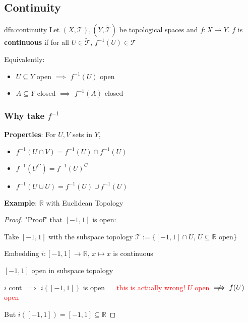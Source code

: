 \documentclass{article}
\begin{document}
\subsection{Continuity}

\begin{dfn}[Continuity]{dfn:continuity}{}
    Let $(X, \mathcal{T}), (Y, \tilde{\mathcal{T}})$ be topological spaces and $f : X \to Y$. $f$ is \textbf{continuous} if for all $U\in \tilde{\mathcal{T}}$, $f^{-1}(U)\in \mathcal{T}$

    \longrule{0.08ex}

    Equivalently:
    \begin{itemize}
        \item $U \subseteq Y$ open $\implies$ $f^{-1}(U)$ open
        \item $A \subseteq Y$ closed $\implies$ $f^{-1}(A)$ closed
    \end{itemize}
\end{dfn}

\subsubsection{Why take \texorpdfstring{$f^{-1}$}{f-1}}

\textbf{Properties}: For $U, V$ sets in $Y$,
\begin{itemize}
    \item $f^{-1}(U \cap V) = f^{-1}(U) \cap f^{-1}(U)$
    \item $f^{-1}(U^{C}) = f^{-1}(U)^{C}$
    \item $f^{-1}(U \cup U) = f^{-1}(U) \cup f^{-1}(U)$
\end{itemize}

\textbf{Example}: $\mathbb{R}$ with Euclidean Topology
\begin{proof}
    "Proof" that $[-1, 1]$ is open:

    Take $[-1, 1]$ with the subspace topology $\mathcal{T} := \{[-1, 1] \cap U,\, U \subseteq \mathbb{R} \text{ open}\}$

    Embedding $i : [-1, 1] \to \mathbb{R},\,x \mapsto x$ is continuous

    $[-1, 1]$ open in subspace topology

    $i$ cont $\implies$ $i([-1,1])$ is open $\quad$ \textcolor{red}{this is actually wrong! $U$ open $\centernot\implies f(U)$ open}

    But $i([-1, 1]) = [-1, 1] \subseteq \mathbb{R}$
\end{proof}
\end{document}
